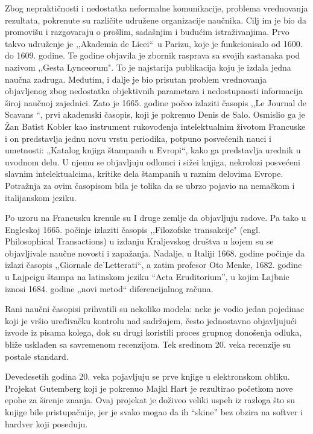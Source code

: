 \documentclass[12pt,a4paper]{article}
\begin{document}
   Zbog nepraktičnosti i nedostatka neformalne komunikacije, problema vrednovanja rezultata, pokrenute su različite udružene organizacije naučnika. Cilj im je bio da promovišu i razgovaraju o prošlim, sadašnjim i budućim istraživanjima. Prvo takvo udruženje je ,,Akademia de Licei“ u Parizu, koje je funkcionisalo od 1600. do 1609. godine. Te godine objavila je zbornik rasprava sa svojih sastanaka pod nazivom ,,Gesta Lynceorum". To je najstarija publikacija koju je izdala jedna naučna zadruga. Međutim, i dalje je bio prisutan problem vrednovanja objavljenog zbog nedostatka objektivnih parametara i nedostupnosti informacija široj naučnoj zajednici. Zato je 1665. godine počeo izlaziti časopis ,,Le Journal de Scavans “, prvi akademski časopis, koji je pokrenuo Denis de Salo. Osmislio ga je Žan Batist Kobler kao instrument rukovođenja intelektualnim životom Francuske i on predstavlja jednu novu vrstu periodika, potpuno posvećenih nauci i umetnosti: „Katalog knjiga štampanih u Evropi“, kako ga predstavlja urednik u uvodnom delu. U njemu se objavljuju odlomci i sižei knjiga, nekrolozi posvećeni slavnim intelektualcima, kritike dela štampanih u raznim delovima Evrope. Potražnja za ovim časopisom bila je tolika da se ubrzo pojavio na nemačkom i italijanskom jeziku.
   
   Po uzoru na Francusku krenule su I druge zemlje da objavljuju radove. Pa tako u Engleskoj 1665. počinje izlaziti časopis ,,Filozofske transakcije" (engl. Philosophical Transactions) u izdanju Kraljevskog društva u kojem su se objavljivale naučne novosti i zapažanja. Nadalje, u Italiji 1668. godine počinje da izlazi časopis ,,Giornale de'Letterati“, a zatim profesor Oto Menke, 1682. godine u Lajpcigu štampa na latinskom jeziku “Acta Eruditorium”, u kojim Lajbnic iznosi 1684. godine „novi metod“ diferencijalnog računa. 
   
   Rani naučni časopisi prihvatili su nekoliko modela: neke je vodio jedan pojedinac koji je vršio uređivačku kontrolu nad sadržajem, često jednostavno objavljujući izvode iz pisama kolega, dok su drugi koristili proces grupnog donošenja odluka, bliže usklađen sa savremenom recenzijom. Tek sredinom 20. veka recenzije su postale standard.
   
   Devedesetih godina 20. veka pojavljuju se prve knjige u elektronskom obliku. Projekat Gutemberg koji je pokrenuo Majkl Hart je rezultirao početkom nove epohe za širenje znanja. Ovaj projekat je doživeo veliki uspeh iz razloga što su knjige bile pristupačnije, jer je svako mogao da ih “skine” bez obzira na softver i hardver koji poseduju. 
  
\end{document}
